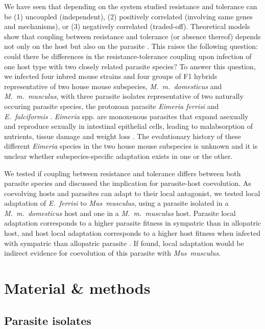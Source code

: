 We have seen that depending on the system studied resistance and tolerance can be (1) uncoupled (independent), (2) positively correlated (involving same genes and mechanisms), or (3) negatively correlated (traded-off). Theoretical models show that coupling between resistance and tolerance (or absence thereof) depends not only on the host but also on the parasite \citep{Carval2010}. This raises the following question: could there be differences in the resistance-tolerance coupling upon infection of one host type with two closely related parasite species? To answer this question, we infected four inbred mouse strains and four groups of F1 hybrids representative of two house mouse subspecies, \textit{M.~m.~domesticus} and \textit{M.~m.~musculus}, with three parasite isolates representative of two naturally occuring parasite species, the protozoan parasite \textit{Eimeria ferrisi} and \textit{E.~falciformis }\citep{jarquin-diaz_detection_2019}. \textit{Eimeria }spp. are monoxenous parasites that expand asexually and reproduce sexually in intestinal epithelial cells, leading to malabsorption of nutrients, tissue damage and weight loss \citep{chapman_chapter_2013}. The evolutionary history of these different \textit{Eimeria} species in the two house mouse subspecies is unknown and it is unclear whether subspecies-specific adaptation exists in one or the other. 

\par
We tested if coupling between resistance and tolerance differs between both parasite species and discussed the implication for parasite-host coevolution. As coevolving hosts and parasites can adapt to their local antagonist, we tested local adaptation of \textit{E.~ferrisi} to \textit{Mus~musculus}, using a parasite isolated in a \textit{M.~m.~domesticus} host and one in a \textit{M.~m.~musculus} host. Parasite local adaptation corresponds to a higher parasite fitness in sympatric than in allopatric host, and host local adaptation corresponds to a higher host fitness when infected with sympatric than allopatric parasite \citep{schulte_host_2011}. If found, local adaptation would be indirect evidence for coevolution of this parasite with \textit{Mus~musculus}.

\section{Material \& methods}

\subsection{Parasite isolates}

